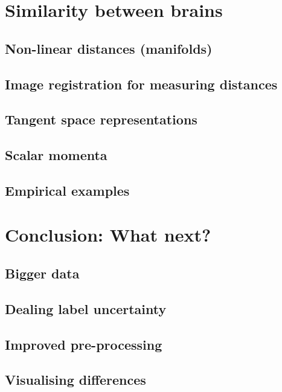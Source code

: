 \documentclass{beamer}
\begin{document}
\section{Similarity between brains}
    \subsection{Non-linear distances (manifolds)}                 
    \subsection{Image registration for measuring distances}       
    \subsection{Tangent space representations}                    
    \subsection{Scalar momenta}                                   
    \subsection{Empirical examples}                               

\section{Conclusion: What next?}
    \subsection{Bigger data}                                      
    \subsection{Dealing label uncertainty}                        
    \subsection{Improved pre-processing}                          
    \subsection{Visualising differences}                          
\end{document}
